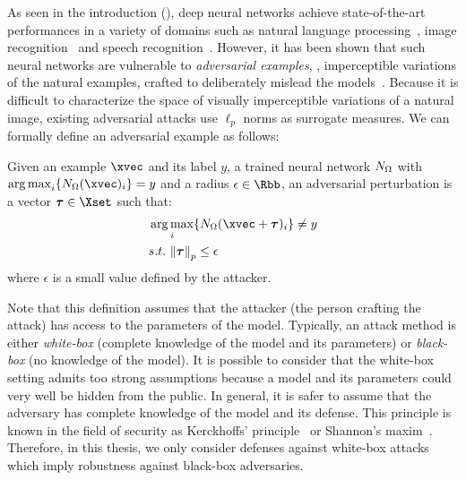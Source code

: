 As seen in the introduction (), deep neural networks achieve state-of-the-art performances in a variety of domains such as natural language processing~\cite{radford2019language}, image recognition~\cite{he2016deep} and speech recognition~\cite{hinton2012deep}.
However, it has been shown that such neural networks are vulnerable to \emph{adversarial examples}, \ie, imperceptible variations of the natural examples, crafted to deliberately mislead the models~\cite{globerson2006nightmare,biggio2013evasion,szegedy2013intriguing}.
Because it is difficult to characterize the space of visually imperceptible variations of a natural image, existing adversarial attacks use $\ell_p$ norms as surrogate measures.
We can formally define an adversarial example as follows:
\begin{definition}
  Given an example $\xvec$ and its label $y$, a trained neural network $N_\Omega$ with $\argmax_i \{ \nn_\weights(\xvec)_i \} = y$ and a radius $\epsilon \in \Rbb$, an adversarial perturbation is a vector $\adv \in \Xset$ such that:
  \begin{align}
    &\argmax_{i} \{ \nn_\weights (\xvec + \adv)_i \} \neq y \\
    &\st\ \norm{\adv}_p \leq \epsilon \notag
  \end{align}
  where $\epsilon$ is a small value defined by the attacker.
\end{definition}

Note that this definition assumes that the attacker (the person crafting the attack) has access to the parameters of the model.
Typically, an attack method is either \emph{white-box} (complete knowledge of the model and its parameters) or \emph{black-box} (no knowledge of the model).
It is possible to consider that the white-box setting admits too strong assumptions because a model and its parameters could very well be hidden from the public.
In general, it is safer to assume that the adversary has complete knowledge of the model and its defense.
This principle is known in the field of security as Kerckhoffs’ principle~\cite{kerckhoffs1883cryptographie} or Shannon's maxim~\cite{shannon1949communication}.
Therefore, in this thesis, we only consider defenses against white-box attacks which imply robustness against black-box adversaries.


